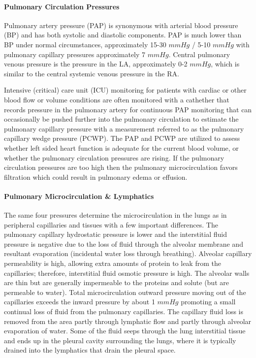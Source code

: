 \paragraph{Pulmonary Circulation Pressures}

Pulmonary artery pressure (PAP) is synonymous with arterial blood pressure (BP) and has both systolic and diastolic components. PAP is much lower than BP under normal circumstances, approximately 15-30 $mmHg$ / 5-10 $mmHg$ with pulmonary capillary pressures approximately 7 $mmHg$. Central pulmonary venous pressure is the pressure in the LA, approximately 0-2 $mmHg$, which is similar to the central systemic venous pressure in the RA. 

Intensive (critical) care unit (ICU) monitoring for patients with cardiac or other blood flow or volume conditions are often monitored with a cathether that records pressure in the pulmonary artery for continuous PAP monitoring that can occasionally be pushed further into the pulmonary circulation to estimate the pulmonary capillary pressure with a measurement referred to as the pulmonary capillary wedge pressure (PCWP). The PAP and PCWP are utilized to assess whether left sided heart function is adequate for the current blood volume, or whether the pulmonary circulation pressures are rising. If the pulmonary circulation pressures are too high then the pulmonary microcirculation favors filtration which could result in pulmonary edema or effusion.

\paragraph{Pulmonary Microcirculation \& Lymphatics}

The same four pressures determine the microcirculation in the lungs as in peripheral capillaries and tissues with a few important differences. The pulmonary capillary hydrostatic pressure is lower and the interstitial fluid pressure is negative due to the loss of fluid through the alveolar membrane and resultant evaporation (incidental water loss through breathing). Alveolar capillary permeability is high, allowing extra amounts of protein to leak from the capillaries; therefore, interstitial fluid osmotic pressure is high. The alveolar walls are thin but are generally impermeable to the proteins and solute (but are permeable to water). Total microcirculation outward pressure moving out of the capillaries exceeds the inward pressure by about 1 $mmHg$ promoting a small continual loss of fluid from the pulmonary capillaries. The capillary fluid loss is removed from the area partly through lymphatic flow and partly through alveolar evaporation of water. Some of the fluid seeps through the lung interstitial tissue and ends up in the pleural cavity surrounding the lungs, where it is typically drained into the lymphatics that drain the pleural space.

